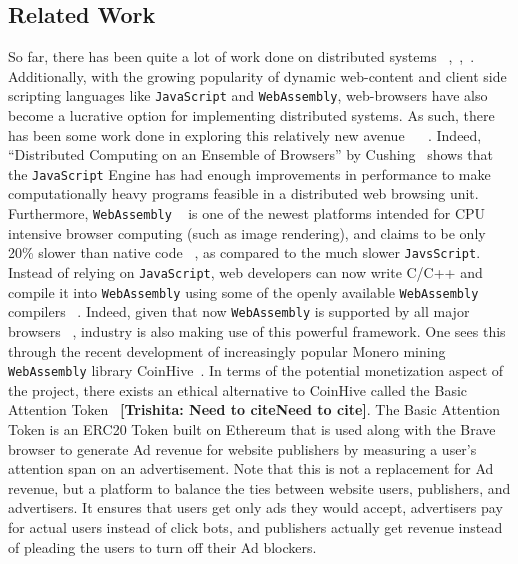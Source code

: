 \documentclass[runningheads]{llncs}
\newcommand{\trishita}[1]{{\color{magenta}\bfseries[Trishita: #1]}}
\begin{document}
\subsection{Related Work}
So far, there has been quite a lot of work done on distributed systems ~\cite{scheduling},~\cite{parallel},~\cite{orca}. Additionally, with the growing popularity of dynamic web-content and client side scripting languages like \verb|JavaScript| and \verb|WebAssembly|, web-browsers have also become a lucrative option for implementing distributed systems. As such, there has been some work done in exploring this relatively new avenue ~\cite{WebFlow} ~\cite{Duda}. 
Indeed, ``Distributed Computing on an Ensemble of Browsers'' by Cushing~\cite{Cushing} shows that the \verb|JavaScript| Engine has had enough improvements in performance to make computationally heavy programs feasible in a distributed web browsing unit. 
Furthermore, \verb|WebAssembly|  ~\cite{webAssembly} is one of the newest platforms intended for CPU intensive browser computing (such as image rendering), and claims to be only 20\% slower than native code ~\cite{wasmPerf}, as compared to the much slower \verb|JavsScript|. Instead of relying on \verb|JavaScript|, web developers can now write C/C++ and compile it into \verb|WebAssembly| using some of the openly available \verb|WebAssembly| compilers ~\cite{emscripten}. Indeed, given that now \verb|WebAssembly| is supported by all major browsers ~\cite{webAssembly}, industry is also making use of this powerful framework. One sees this through the recent development of increasingly popular Monero mining \verb|WebAssembly| library CoinHive~\cite{coinhive}. In terms of the potential monetization aspect of the project, there exists an ethical alternative to CoinHive called the Basic Attention Token ~\trishita{Need to citeNeed to cite}. The Basic Attention Token is an ERC20 Token built on Ethereum that is used along with the Brave browser to generate Ad revenue for website publishers by measuring a user's attention span on an advertisement. Note that this is not a replacement for Ad revenue, but a platform to balance the ties between website users, publishers, and advertisers. It ensures that users get only ads they would accept, advertisers pay for actual users instead of click bots, and publishers actually get revenue instead of pleading the users to turn off their Ad blockers.
\end{document}
